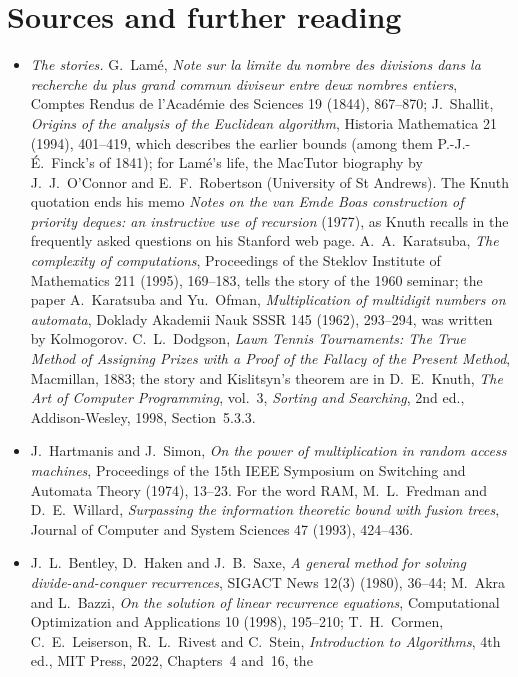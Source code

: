 \section*{Sources and further reading}

\begin{itemize}
\item \emph{The stories.} G.~Lam\'e, \emph{Note sur la limite du nombre des divisions dans la recherche du plus grand commun diviseur entre deux nombres
entiers}, Comptes Rendus de l'Acad\'emie des Sciences 19 (1844), 867--870; J.~Shallit, \emph{Origins of the analysis of the Euclidean algorithm},
Historia Mathematica 21 (1994), 401--419, which describes the earlier bounds (among them P.-J.-\'E.~Finck's of 1841); for Lam\'e's life, the MacTutor
biography by J.~J.~O'Connor and E.~F.~Robertson (University of St Andrews).
The Knuth quotation ends his memo \emph{Notes on the van Emde Boas construction of priority deques: an instructive use of recursion} (1977), as
Knuth recalls in the frequently asked questions on his Stanford web page. A.~A.~Karatsuba, \emph{The complexity of computations},
Proceedings of the Steklov Institute of Mathematics 211 (1995), 169--183, tells the story of the 1960 seminar; the paper A.~Karatsuba and
Yu.~Ofman, \emph{Multiplication of multidigit numbers on automata}, Doklady Akademii Nauk SSSR 145 (1962), 293--294, was written by Kolmogorov.
C.~L.~Dodgson, \emph{Lawn Tennis Tournaments: The True Method of Assigning Prizes with a Proof of the Fallacy of the Present Method}, Macmillan, 1883;
the story and Kislitsyn's theorem are in D.~E.~Knuth, \emph{The Art of Computer Programming}, vol.~3, \emph{Sorting and Searching}, 2nd ed.,
Addison-Wesley, 1998, Section~5.3.3.
\item J.~Hartmanis and J.~Simon, \emph{On the power of multiplication in random access machines}, Proceedings of the 15th IEEE Symposium on
Switching and Automata Theory (1974), 13--23. For the word RAM, M.~L.~Fredman and D.~E.~Willard, \emph{Surpassing the information theoretic bound
with fusion trees}, Journal of Computer and System Sciences 47 (1993), 424--436.
\item J.~L.~Bentley, D.~Haken and J.~B.~Saxe, \emph{A general method for solving divide-and-conquer recurrences}, SIGACT News 12(3) (1980), 36--44;
M.~Akra and L.~Bazzi, \emph{On the solution of linear recurrence equations}, Computational Optimization and Applications 10 (1998), 195--210;
T.~H.~Cormen, C.~E.~Leiserson, R.~L.~Rivest and C.~Stein, \emph{Introduction to Algorithms}, 4th ed., MIT Press, 2022, Chapters~4 and~16, the

\end{itemize}
